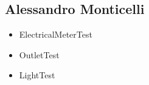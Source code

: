 \subsection{Alessandro Monticelli}

\begin{itemize}
    \item ElectricalMeterTest
    \item OutletTest
    \item LightTest
\end{itemize}